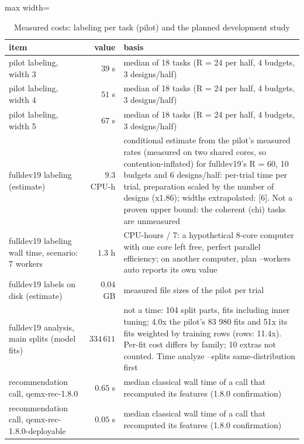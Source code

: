 \begin{table}[htbp]
\centering
\small
\setlength{\tabcolsep}{3.8pt}
\caption{Measured costs: labeling per task (pilot) and the planned development study}
\label{tab:qem190-costs}
\begin{adjustbox}{max width=\textwidth}\begin{tabular}{lrp{8.5cm}}
\toprule
item & value & basis \\
\midrule
pilot labeling, width 3 & $39$ s & median of 18 tasks (R = 24 per half, 4 budgets, 3 designs/half) \\
pilot labeling, width 4 & $51$ s & median of 18 tasks (R = 24 per half, 4 budgets, 3 designs/half) \\
pilot labeling, width 5 & $67$ s & median of 18 tasks (R = 24 per half, 4 budgets, 3 designs/half) \\
fulldev19 labeling (estimate) & $9.3$ CPU-h & conditional estimate from the pilot's measured rates (measured on two shared cores, so contention-inflated) for fulldev19's R = 60, 10 budgets and 6 designs/half: per-trial time per trial, preparation scaled by the number of designs (x1.86); widths extrapolated: [6]. Not a proven upper bound: the coherent (chi) tasks are unmeasured \\
fulldev19 labeling wall time, scenario: 7 workers & $1.3$ h & CPU-hours / 7: a hypothetical 8-core computer with one core left free, perfect parallel efficiency; on another computer, plan --workers auto reports its own value \\
fulldev19 labels on disk (estimate) & $0.04$ GB & measured file sizes of the pilot per trial \\
fulldev19 analysis, main splits (model fits) & $334\,611$ & not a time: 104 split parts, fits including inner tuning; 4.0x the pilot's 83 980 fits and 51x its fits weighted by training rows (rows: 11.4x). Per-fit cost differs by family; 10 extras not counted. Time analyze --splits same-distribution first \\
recommendation call, qemx-rec-1.8.0 & $0.65$ s & median classical wall time of a call that recomputed its features (1.8.0 confirmation) \\
recommendation call, qemx-rec-1.8.0-deployable & $0.05$ s & median classical wall time of a call that recomputed its features (1.8.0 confirmation) \\
\bottomrule
\end{tabular}\end{adjustbox}

\end{table}
